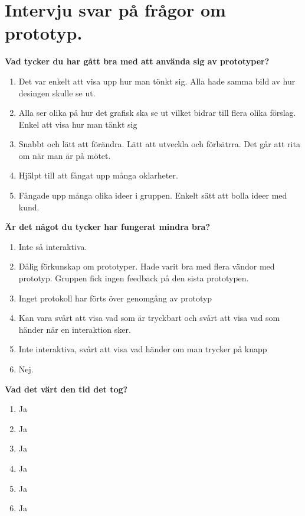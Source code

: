 \chapter{Intervju svar på frågor om prototyp.}\label{appendix:niclas}

	\textbf{Vad tycker du har gått bra med att använda sig av prototyper?} 
	\begin{enumerate}
	\item Det var enkelt att visa upp hur man tönkt sig. Alla hade samma bild av hur desingen skulle se ut. 
	\item Alla ser olika på hur det grafisk ska se ut vilket bidrar till flera olika förslag. Enkel att visa hur man tänkt 		  sig  
	\item Snabbt och lätt att förändra. Lätt att utveckla och förbätrra. Det går att rita om när man är på mötet. 
	\item Hjälpt till att fångat upp många oklarheter. 
	\item Fångade upp många olika ideer i gruppen. Enkelt sätt att bolla ideer med kund.
	\end{enumerate}		
	
 	\textbf{Är det något du tycker har fungerat mindra bra?} 
 	\begin{enumerate}
 	\item Inte så interaktiva. 
	\item Dålig förkunskap om prototyper. Hade varit bra med flera vändor med prototyp. Gruppen fick ingen feedback på den 		  sista prototypen.
	\item Inget protokoll har förts över genomgång av prototyp
	\item Kan vara svårt att visa vad som är tryckbart och svårt att visa vad som händer när en interaktion sker. 
	\item Inte interaktiva, svårt att visa vad händer om man trycker på knapp
	\item Nej.
	
 	\end{enumerate}
 	
 	\textbf{Vad det värt den tid det tog?} 
 	\begin{enumerate}
 	\item Ja
	\item Ja 
	\item Ja 
	\item Ja 
	\item Ja   
	\item Ja 

 	\end{enumerate}
 
